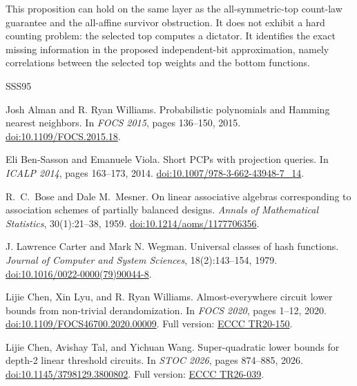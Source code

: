 \documentclass[11pt,letterpaper]{article}
\theoremstyle{definition}
\theoremstyle{remark}
\begin{document}
This proposition can hold on the same layer as the all-symmetric-top
count-law guarantee and the all-affine survivor obstruction.  It does
not exhibit a hard counting problem: the selected top computes a
dictator.  It identifies the exact missing information in the proposed
independent-bit approximation, namely correlations between the selected
top weights and the bottom functions.


\clearpage
\begin{thebibliography}{SSS95}
\raggedright

Josh Alman and R. Ryan Williams.
\newblock Probabilistic polynomials and Hamming nearest neighbors.
\newblock In \emph{FOCS 2015}, pages 136--150, 2015.
\newblock \href{https://doi.org/10.1109/FOCS.2015.18}{doi:10.1109/FOCS.2015.18}.

Eli Ben-Sasson and Emanuele Viola.
\newblock Short PCPs with projection queries.
\newblock In \emph{ICALP 2014}, pages 163--173, 2014.
\newblock \href{https://doi.org/10.1007/978-3-662-43948-7_14}{doi:10.1007/978-3-662-43948-7\_14}.

R.~C.~Bose and Dale M.~Mesner.
\newblock On linear associative algebras corresponding to association
  schemes of partially balanced designs.
\newblock \emph{Annals of Mathematical Statistics}, 30(1):21--38, 1959.
\newblock \href{https://doi.org/10.1214/aoms/1177706356}{doi:10.1214/aoms/1177706356}.

J. Lawrence Carter and Mark N. Wegman.
\newblock Universal classes of hash functions.
\newblock \emph{Journal of Computer and System Sciences}, 18(2):143--154, 1979.
\newblock \href{https://doi.org/10.1016/0022-0000(79)90044-8}{doi:10.1016/0022-0000(79)90044-8}.

Lijie Chen, Xin Lyu, and R. Ryan Williams.
\newblock Almost-everywhere circuit lower bounds from non-trivial derandomization.
\newblock In \emph{FOCS 2020}, pages 1--12, 2020.
\newblock \href{https://doi.org/10.1109/FOCS46700.2020.00009}{doi:10.1109/FOCS46700.2020.00009}.
Full version: \href{https://eccc.weizmann.ac.il/report/2020/150/}{ECCC TR20-150}.

Lijie Chen, Avishay Tal, and Yichuan Wang.
\newblock Super-quadratic lower bounds for depth-2 linear threshold circuits.
\newblock In \emph{STOC 2026}, pages 874--885, 2026.
\newblock \href{https://doi.org/10.1145/3798129.3800802}{doi:10.1145/3798129.3800802}.
Full version: \href{https://eccc.weizmann.ac.il/report/2026/039/}{ECCC TR26-039}.


\end{thebibliography}
\end{document}
